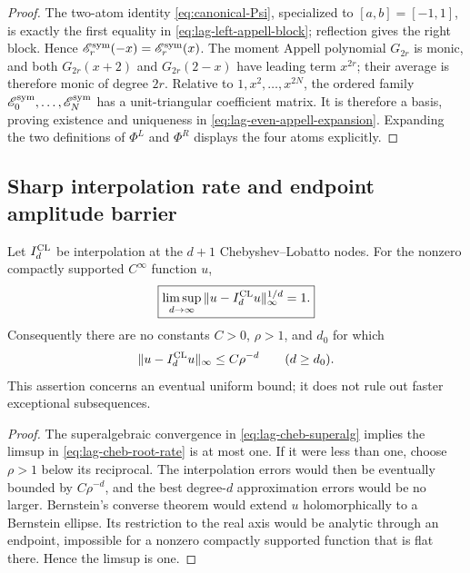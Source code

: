 \begin{proof}
The two-atom identity \eqref{eq:canonical-Psi}, specialized to
$[a,b]=[-1,1]$, is exactly the first equality in
\eqref{eq:lag-left-appell-block}; reflection gives the right block.  Hence
$\mathscr E_r^{\rm sym}(-x)=\mathscr E_r^{\rm sym}(x)$.  The moment Appell
polynomial $G_{2r}$ is monic, and both
$G_{2r}(x+2)$ and $G_{2r}(2-x)$ have leading term $x^{2r}$; their average is
therefore monic of degree $2r$.  Relative to
$1,x^2,\ldots,x^{2N}$, the ordered family
$\mathscr E_0^{\rm sym},\ldots,\mathscr E_N^{\rm sym}$ has a unit-triangular
coefficient matrix.  It is therefore a
basis, proving existence and uniqueness in
\eqref{eq:lag-even-appell-expansion}.  Expanding the two definitions of
$\Phi^L$ and $\Phi^R$ displays the four atoms explicitly.
\end{proof}

\subsection{Sharp interpolation rate and endpoint amplitude barrier}

\begin{theorem}
\label{thm:lag-cheb-root-rate}
Let $I_d^{\rm CL}$ be interpolation at the $d+1$ Chebyshev--Lobatto nodes.
For the nonzero compactly supported $C^\infty$ function $u$,
\begin{equation}
 \boxed{\limsup_{d\to\infty}
 \|u-I_d^{\rm CL}u\|_\infty^{1/d}=1.}
 \label{eq:lag-cheb-root-rate}
\end{equation}
Consequently there are no constants $C>0$, $\rho>1$, and $d_0$ for which
\[
 \|u-I_d^{\rm CL}u\|_\infty\le C\rho^{-d}
 \qquad(d\ge d_0).
\]
This assertion concerns an eventual uniform bound; it does not rule out
faster exceptional subsequences.
\end{theorem}

\begin{proof}
The superalgebraic convergence in \eqref{eq:lag-cheb-superalg} implies the
limsup in \eqref{eq:lag-cheb-root-rate} is at most one.  If it were less than
one, choose $\rho>1$ below its reciprocal.  The interpolation errors would
then be eventually bounded by $C\rho^{-d}$, and the best degree-$d$
approximation errors would be no larger.  Bernstein's converse theorem would
extend $u$ holomorphically to a Bernstein ellipse.  Its restriction to the
real axis would be analytic through an endpoint, impossible for a nonzero
compactly supported function that is flat there.  Hence the limsup is one.
\end{proof}

